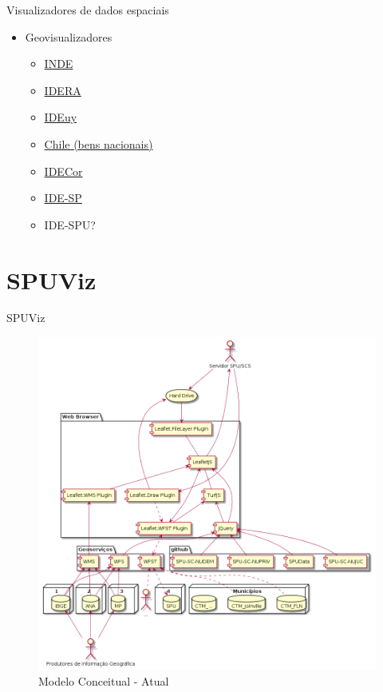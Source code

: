 \documentclass[9pt,ignorenonframetext,]{beamer}
\providecommand{\tightlist}{%
  \setlength{\itemsep}{0pt}\setlength{\parskip}{0pt}}
\begin{document}
\begin{frame}[t]{Visualizadores de dados espaciais}
\protect\hypertarget{visualizadores-de-dados-espaciais}{}

\begin{itemize}[<+->]
\tightlist
\item
  Geovisualizadores

  \begin{itemize}[<+->]
  \tightlist
  \item
    \href{https://visualizador.inde.gov.br/}{INDE}
  \item
    \href{https://mapa.idera.gob.ar/}{IDERA}
  \item
    \href{https://www.gub.uy/infraestructura-datos-espaciales/publico/visualizador}{IDEuy}
  \item
    \href{http://www.catastro.cl/}{Chile (bens nacionais)}
  \item
    \href{https://idecor.cba.gov.ar/}{IDECor}
  \item
    \href{http://www.idesp.sp.gov.br/Visualizador}{IDE-SP}
  \item
    IDE-SPU?
  \end{itemize}
\end{itemize}

\end{frame}

\hypertarget{spuviz}{%
\section{SPUViz}\label{spuviz}}

\begin{frame}{SPUViz}
\protect\hypertarget{spuviz-1}{}

\begin{figure}[H]

{\centering \includegraphics[width=0.8\linewidth]{images/modeloConceitual_1} 

}

\caption{Modelo Conceitual - Atual}\label{fig:unnamed-chunk-12}
\end{figure}

\end{frame}
\end{document}
